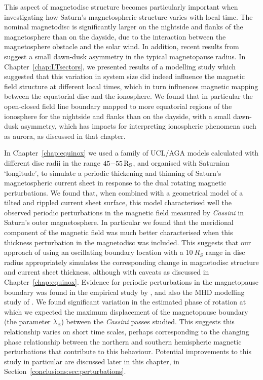 This aspect of magnetodisc structure  becomes particularly important when investigating how Saturn's magnetospheric structure varies with local time. The nominal magnetodisc is significantly larger on the nightside and flanks of the magnetosphere than on the dayside, due to the interaction between the magnetosphere obstacle and the solar wind. In addition, recent results from \citet{pilkington2015b} suggest a small dawn-dusk asymmetry in the typical magnetopause radius. In Chapter~\ref{chap:LTsectors}, we presented results of a modelling study which suggested that this variation in system size did indeed influence the magnetic field structure at different local times, which in turn influences magnetic mapping between the equatorial disc and the ionosphere. We found that in particular the open-closed field line boundary mapped to more equatorial regions of the ionosphere for the nightside and flanks than on the dayside, with a small dawn-dusk asymmetry, which has impacts for interpreting ionospheric phenomena such as aurora, as discussed in that chapter.

In Chapter~\ref{chap:equinox} we used a family of UCL/AGA models calculated with different disc radii in the range $45{\--}\SI{55}{R_S}$, and organised with Saturnian `longitude',  to simulate a periodic thickening and thinning of Saturn's magnetospheric current sheet in response to the dual rotating magnetic perturbations. We found that, when combined with a geometrical model of a tilted and rippled current sheet surface, this model characterised well the observed periodic perturbations in the magnetic field measured by \textit{Cassini} in Saturn's outer magnetosphere. In particular we found that the meridional component of  the magnetic field was much better characterised when this thickness perturbation in the magnetodisc was included. This suggests that our approach of using an oscillating boundary location with a $\SI{10}{R_S}$ range in disc radius appropriately simulates the corresponding change in magnetodisc structure and current sheet thickness, although with caveats as discussed in Chapter~\ref{chap:equinox}. Evidence for periodic perturbations in  the magnetopause boundary was found in the empirical study by \citet{clarke2010}, and also the MHD modelling study of \citet{kivelson2014}. We found significant variation in the estimated phase of rotation at which we expected the maximum displacement of the magnetopause boundary (the parameter $\lambda_\mathrm{B}$) between the \textit{Cassini} passes studied. This suggests this relationship varies on short time scales, perhaps corresponding  to the changing phase relationship between the northern and southern hemispheric magnetic perturbations that contribute to this behaviour. Potential improvements to this study in particular are discussed later in this chapter, in Section~\ref{conclusions:sec:perturbations}.

